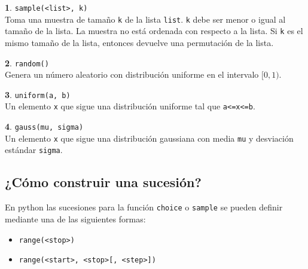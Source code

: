 \documentclass[12pt]{article}
\theoremstyle{definition}
\newtheorem{funcion}{}[section]
\begin{document}
\begin{funcion}
  \verb|sample(<list>, k)| \\[1ex]
  Toma una muestra de tamaño \verb|k| de la lista \verb|list|. \verb|k| debe ser menor o igual al tamaño de la lista. La muestra no está ordenada con respecto a la lista. Si \verb|k| es el mismo tamaño de la lista, entonces devuelve una permutación de la lista.
\end{funcion}

\begin{funcion}
  \verb|random()| \\[1ex]
  Genera un número aleatorio con distribución uniforme en el intervalo $[0, 1)$.
\end{funcion}

\begin{funcion}
  \verb|uniform(a, b)| \\[1ex]
  Un elemento \verb|x| que sigue una distribución uniforme tal que \verb|a<=x<=b|.
\end{funcion}

\begin{funcion}
  \verb|gauss(mu, sigma)| \\[1ex]
  Un elemento \verb|x| que sigue una distribución gaussiana con media \verb|mu| y desviación estándar \verb|sigma|.
\end{funcion}

\subsection{¿Cómo construir una sucesión?}

En python las sucesiones para la función \verb|choice| o \verb|sample| se pueden definir mediante una de las siguientes formas:
\begin{itemize}
  \item \verb|range(<stop>)|
  \item \verb|range(<start>, <stop>[, <step>])|
\end{itemize}

\end{document}
